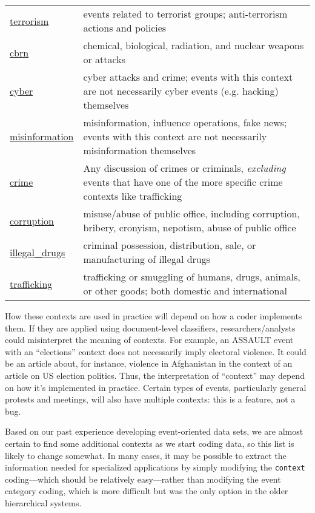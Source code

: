 \documentclass[11pt]{report}
\newcommand{\plcat}[1]{\textsf{#1}}
\newcommand{\txt}[1]{\texttt{#1}}
\begin{document}
\begin{longtable}{|p{}|L{.73\textwidth}|}
\hyperref[context:terrorism]{terrorism} & events related to terrorist groups; anti-terrorism actions and policies \\
\hyperref[context:cbrn]{cbrn} & chemical, biological, radiation, and nuclear weapons or attacks  \\
\hyperref[context:cyber]{cyber} & cyber attacks and crime; events with this context are not necessarily cyber events (e.g. hacking) themselves\\
\hyperref[context:misinfo]{misinformation} & misinformation, influence operations, fake news; events with this context are not necessarily misinformation themselves\\
\hyperref[context:crime]{crime} & Any discussion of crimes or criminals, \textit{excluding} events that have one of the more specific crime contexts like trafficking \\
\hyperref[context:corruption]{corruption} &  misuse/abuse of public office, including corruption, bribery, cronyism, nepotism, abuse of public office  \\
\hyperref[context:drugs]{illegal\_drugs} & criminal possession, distribution, sale, or manufacturing of illegal drugs \\
\hyperref[context:trafficking]{trafficking} & trafficking or smuggling of humans, drugs, animals, or other goods; both domestic and international \\
\end{longtable}


How these contexts are used in practice will depend on how a coder implements them. If they are applied using document-level classifiers, researchers/analysts could misinterpret the meaning of contexts. For example, an \plcat{ASSAULT} event with an ``elections'' context does not necessarily imply electoral violence. It could be an article about, for instance, violence in Afghanistan in the context of an article on US election politics. Thus, the interpretation of ``context'' may depend on how it's implemented in practice. Certain types of events, particularly general protests and meetings, will also have multiple contexts: this is a feature, not a bug.

Based on our past experience developing event-oriented data sets, we are almost certain to find some additional contexts as we start coding data, so this list is likely to change somewhat.  In many cases, it may be possible to extract the information needed for specialized applications by simply modifying the \txt{context} coding---which should be relatively easy---rather than modifying the event category coding, which is more difficult but was the only option in the older hierarchical systems.
\end{document}
